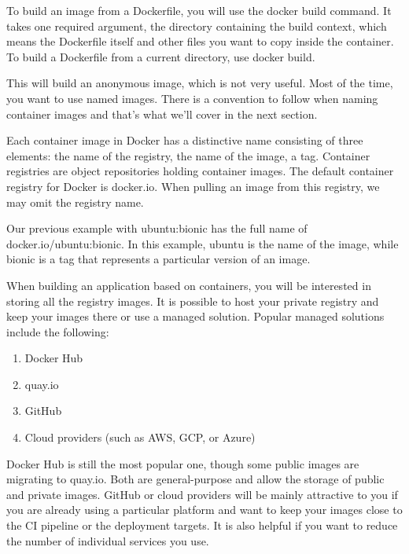 To build an image from a Dockerfile, you will use the docker build command. It takes one required argument, the directory containing the build context, which means the Dockerfile itself and other files you want to copy inside the container. To build a Dockerfile from a current directory, use docker build.

This will build an anonymous image, which is not very useful. Most of the time, you want to use named images. There is a convention to follow when naming container images and that's what we'll cover in the next section.


Each container image in Docker has a distinctive name consisting of three elements: the name of the registry, the name of the image, a tag. Container registries are object repositories holding container images. The default container registry for Docker is docker.io. When pulling an image from this registry, we may omit the registry name.

Our previous example with ubuntu:bionic has the full name of docker.io/ubuntu:bionic. In this example, ubuntu is the name of the image, while bionic is a tag that represents a particular version of an image.

When building an application based on containers, you will be interested in storing all the registry images. It is possible to host your private registry and keep your images there or use a managed solution. Popular managed solutions include the following:

\begin{enumerate}
\item 
Docker Hub

\item 
quay.io

\item 
GitHub

\item 
Cloud providers (such as AWS, GCP, or Azure)
\end{enumerate}

Docker Hub is still the most popular one, though some public images are migrating to quay.io. Both are general-purpose and allow the storage of public and private images. GitHub or cloud providers will be mainly attractive to you if you are already using a particular platform and want to keep your images close to the CI pipeline or the deployment targets. It is also helpful if you want to reduce the number of individual services you use. 

